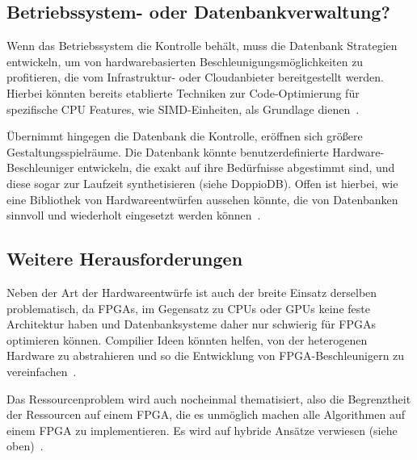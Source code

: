 \documentclass[conference]{IEEEtran}
\begin{document}
\subsection{Betriebssystem- oder Datenbankverwaltung?}

Wenn das Betriebssystem die Kontrolle behält, muss die Datenbank Strategien entwickeln, um von hardwarebasierten Beschleunigungsmöglichkeiten zu profitieren,
die vom Infrastruktur- oder Cloudanbieter bereitgestellt werden. Hierbei könnten bereits etablierte Techniken zur Code-Optimierung für spezifische CPU Features,
wie SIMD-Einheiten, als Grundlage dienen~\cite{istvan_glass_2019}.

Übernimmt hingegen die Datenbank die Kontrolle, eröffnen sich größere Gestaltungsspielräume. Die Datenbank könnte benutzerdefinierte Hardware-Beschleuniger entwickeln,
die exakt auf ihre Bedürfnisse abgestimmt sind, und diese sogar zur Laufzeit synthetisieren (siehe DoppioDB).
Offen ist hierbei, wie eine Bibliothek von Hardwareentwürfen aussehen könnte, die von Datenbanken sinnvoll und wiederholt eingesetzt werden können~\cite{istvan_glass_2019}.


\subsection{Weitere Herausforderungen}
Neben der Art der Hardwareentwürfe ist auch der breite Einsatz derselben problematisch, da FPGAs, im Gegensatz zu CPUs oder GPUs keine feste Architektur haben
und Datenbanksysteme daher nur schwierig für FPGAs optimieren können. Compilier Ideen könnten helfen, von der heterogenen Hardware zu abstrahieren und so
die Entwicklung von FPGA-Beschleunigern zu vereinfachen~\cite{istvan_glass_2019}.

Das Ressourcenproblem wird auch nocheinmal thematisiert, also die Begrenztheit der
Ressourcen auf einem FPGA, die es unmöglich machen alle Algorithmen auf einem FPGA zu implementieren. Es wird auf hybride Ansätze verwiesen (siehe oben)~\cite{istvan_glass_2019}.
\end{document}
